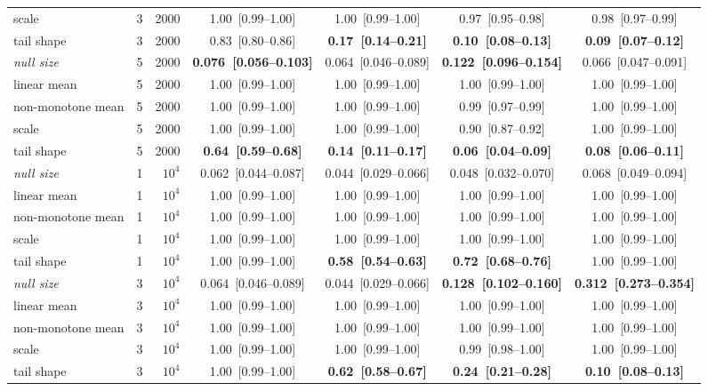 \begin{table}[p]
{\begin{tabular}{llrcccc}
scale & 3 & 2000 & 1.00~[0.99--1.00] & 1.00~[0.99--1.00] & 0.97~[0.95--0.98] & 0.98~[0.97--0.99] \\
tail shape & 3 & 2000 & 0.83~[0.80--0.86] & \textbf{0.17~[0.14--0.21]} & \textbf{0.10~[0.08--0.13]} & \textbf{0.09~[0.07--0.12]} \\
\midrule
\emph{null size} & 5 & 2000 & \textbf{0.076~[0.056--0.103]} & 0.064~[0.046--0.089] & \textbf{0.122~[0.096--0.154]} & 0.066~[0.047--0.091] \\
linear mean & 5 & 2000 & 1.00~[0.99--1.00] & 1.00~[0.99--1.00] & 1.00~[0.99--1.00] & 1.00~[0.99--1.00] \\
non-monotone mean & 5 & 2000 & 1.00~[0.99--1.00] & 1.00~[0.99--1.00] & 0.99~[0.97--0.99] & 1.00~[0.99--1.00] \\
scale & 5 & 2000 & 1.00~[0.99--1.00] & 1.00~[0.99--1.00] & 0.90~[0.87--0.92] & 1.00~[0.99--1.00] \\
tail shape & 5 & 2000 & \textbf{0.64~[0.59--0.68]} & \textbf{0.14~[0.11--0.17]} & \textbf{0.06~[0.04--0.09]} & \textbf{0.08~[0.06--0.11]} \\
\midrule
\emph{null size} & 1 & $10^4$ & 0.062~[0.044--0.087] & 0.044~[0.029--0.066] & 0.048~[0.032--0.070] & 0.068~[0.049--0.094] \\
linear mean & 1 & $10^4$ & 1.00~[0.99--1.00] & 1.00~[0.99--1.00] & 1.00~[0.99--1.00] & 1.00~[0.99--1.00] \\
non-monotone mean & 1 & $10^4$ & 1.00~[0.99--1.00] & 1.00~[0.99--1.00] & 1.00~[0.99--1.00] & 1.00~[0.99--1.00] \\
scale & 1 & $10^4$ & 1.00~[0.99--1.00] & 1.00~[0.99--1.00] & 1.00~[0.99--1.00] & 1.00~[0.99--1.00] \\
tail shape & 1 & $10^4$ & 1.00~[0.99--1.00] & \textbf{0.58~[0.54--0.63]} & \textbf{0.72~[0.68--0.76]} & 1.00~[0.99--1.00] \\
\midrule
\emph{null size} & 3 & $10^4$ & 0.064~[0.046--0.089] & 0.044~[0.029--0.066] & \textbf{0.128~[0.102--0.160]} & \textbf{0.312~[0.273--0.354]} \\
linear mean & 3 & $10^4$ & 1.00~[0.99--1.00] & 1.00~[0.99--1.00] & 1.00~[0.99--1.00] & 1.00~[0.99--1.00] \\
non-monotone mean & 3 & $10^4$ & 1.00~[0.99--1.00] & 1.00~[0.99--1.00] & 1.00~[0.99--1.00] & 1.00~[0.99--1.00] \\
scale & 3 & $10^4$ & 1.00~[0.99--1.00] & 1.00~[0.99--1.00] & 0.99~[0.98--1.00] & 1.00~[0.99--1.00] \\
tail shape & 3 & $10^4$ & 1.00~[0.99--1.00] & \textbf{0.62~[0.58--0.67]} & \textbf{0.24~[0.21--0.28]} & \textbf{0.10~[0.08--0.13]} \\

\end{tabular}}
\end{table}
